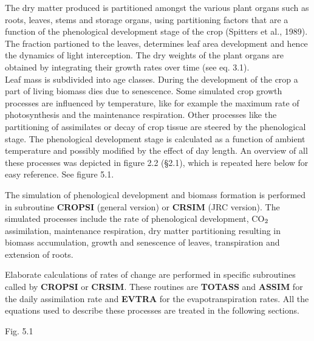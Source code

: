 \documentclass[11pt]{article}
\newcommand{\FigDir}{.}
\begin{document}
\bigskip
\bigskip
The dry matter produced is partitioned amongst the various plant organs such as roots,
leaves, stems and storage organs, using partitioning factors that are a function of the
phenological development stage of the crop (Spitters et al., 1989). The fraction partioned
to the leaves, determines leaf area development and hence the dynamics of light intercep\-tion. The dry weights of the plant organs are obtained by integrating their growth rates
over time (see eq. 3.1). \\
Leaf mass is subdivided into age classes. During the development of the crop a part of
living biomass dies due to senescence. Some simulated crop growth processes are
influenced by temperature, like for example the maximum rate of photosyn\-thesis and the
maintenance respiration. Other processes like the partitioning of assimilates or decay of
crop tissue are steered by the pheno\-log\-ical stage. The phenological development stage is
calculated as a function of ambient temperature and possibly modified by the effect of day
length. An overview of all these processes was depicted in figure 2.2 (\S 2.1), which is
repeated here below for easy reference. See figure 5.1.

\bigskip
\bigskip
\bigskip
 The simulation of phenological development and biomass formation is performed in
subroutine {\bf CROPSI} (general version) or {\bf CRSIM} (JRC version). The simulated process\-es
include the rate of pheno\-logical develop\-ment, CO$_{{\rm 2}}$ assimilation, mainte\-nance respiration,
dry matter partition\-ing resulting in biomass accumulation, growth and senescence of
leaves, transpiration and extension of roots. 

Elaborate calculations of rates of change are performed in specific subroutines called by
{\bf CROPSI} or {\bf CRSIM}. These routines are {\bf TOTASS} and {\bf ASSIM} for the daily assimilation
rate and {\bf EVTRA} for the {\nobreak}evapotranspiration rates. All the equations used to describe these
processes are treated in the following sections.

\bigskip
\bigskip
\begin{figure}[htbp]
\begin{forcewidth}{\textwidth}
 \begin{center}\InputPS{\FigDir/ASIMTREE.eps} \end{center}
\end{forcewidth}
\end{figure}

 \bigskip
Fig. 5.1
\testlastline
\end{document}
